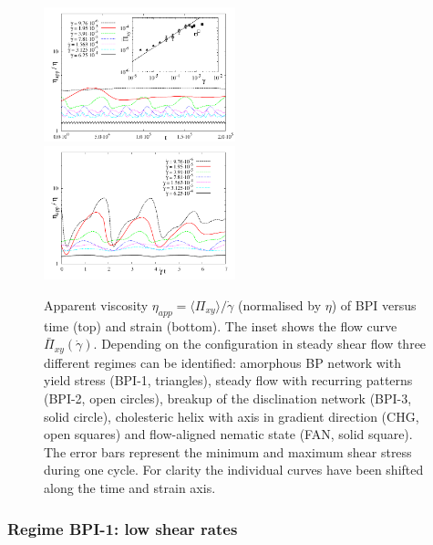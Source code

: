 \documentclass[8.5pt,twoside,twocolumn]{article}
\newcommand{\gd}{\dot{\gamma}}
\begin{document}
\begin{figure}[htpb]
\includegraphics[width=0.495\textwidth]{stress_bp1.pdf}
\includegraphics[width=0.495\textwidth]{stress_vs_strain_bp1.pdf}
\caption{Apparent viscosity $\eta_{app}=\langle \Pi_{xy}\rangle/\dot{\gamma}$ (normalised by $\eta$) of BPI versus time (top) 
and strain (bottom). The inset shows the flow curve $\bar{\Pi}_{xy}(\gd)$. 
Depending on the configuration in steady shear flow three different regimes 
can be identified: amorphous BP network with yield stress (BPI-1, triangles), 
steady flow with recurring patterns (BPI-2, open circles), 
breakup of the disclination network (BPI-3, solid circle), 
cholesteric helix with axis in gradient direction (CHG, open squares) 
and flow-aligned nematic state (FAN, solid square). 
The error bars represent the minimum and maximum shear stress 
during one cycle. For clarity the individual curves have been shifted along
the time and strain axis.}
\label{bp1-rheo}
\end{figure}


\subsubsection{Regime BPI-1: low shear rates }
\end{document}
